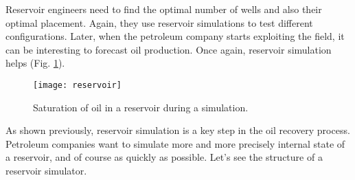 Reservoir engineers need to find the optimal number of wells and also their optimal placement.
%
Again, they use reservoir simulations to test different configurations.
%
Later, when the petroleum company starts exploiting the field, it can be interesting to forecast oil production.
%
Once again, reservoir simulation helps (Fig. \ref{fig:floviz}).

\begin{figure}[!ht]
  \centering
  \texttt{[image: reservoir]}
  \caption{Saturation of oil in a reservoir during a simulation.}
\label{fig:floviz}
\end{figure}


As shown previously, reservoir simulation is a key step in the oil recovery process.
%
Petroleum companies want to simulate more and more precisely internal state of a reservoir, and of course as quickly as possible.
%
Let's see the structure of a reservoir simulator.
